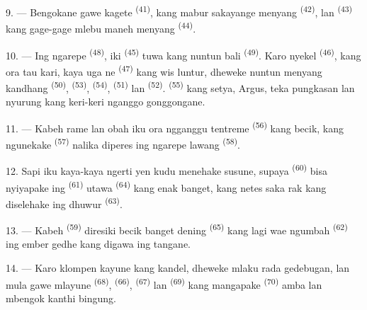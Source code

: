 9. --- Bengokane gawe kagete  \textsuperscript{(41)},
kang mabur sakayange menyang  \textsuperscript{(42)},
lan  \textsuperscript{(43)} kang gage-gage mlebu maneh
menyang  \textsuperscript{(44)}.

10. --- Ing ngarepe  \textsuperscript{(48)}, iki
 \textsuperscript{(45)} tuwa kang nuntun bali
 \textsuperscript{(49)}. Karo nyekel
 \textsuperscript{(46)}, kang ora tau kari, kaya uga
ne \textsuperscript{(47)} kang wis luntur, dheweke
nuntun menyang kandhang 
\textsuperscript{(50)},  \textsuperscript{(53)},
 \textsuperscript{(54)}, 
\textsuperscript{(51)} lan 
\textsuperscript{(52)}.  \textsuperscript{(55)} kang setya,
Argus, teka pungkasan lan nyurung kang keri-keri nganggo gonggongane.

11. --- Kabeh rame lan obah iku ora ngganggu tentreme  \textsuperscript{(56)} kang becik, kang ngunekake
 \textsuperscript{(57)} nalika diperes ing ngarepe
lawang  \textsuperscript{(58)}.

12. Sapi iku kaya-kaya ngerti yen kudu menehake susune, supaya
 \textsuperscript{(60)} bisa nyiyapake
 ing  \textsuperscript{(61)}
utawa  \textsuperscript{(64)} kang enak banget, kang netes
saka rak kang diselehake ing dhuwur 
\textsuperscript{(63)}.

13. --- Kabeh  \textsuperscript{(59)} diresiki becik
banget dening  \textsuperscript{(65)} kang lagi wae
ngumbah  \textsuperscript{(62)} ing ember gedhe kang
digawa ing tangane.

\VUsaut{3.0mm}
\VUsaut{3.0mm}

14. --- Karo klompen kayune kang kandel, dheweke mlaku rada gedebugan,
lan mula gawe mlayune  \textsuperscript{(68)},
 \textsuperscript{(66)}, 
\textsuperscript{(67)} lan  \textsuperscript{(69)} kang
mangapake  \textsuperscript{(70)} amba lan mbengok
kanthi bingung.

